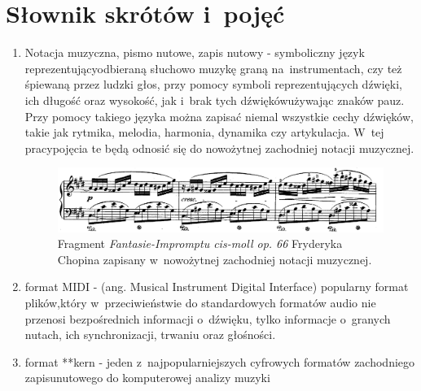 \section{Słownik skrótów i~pojęć}
	
\begin{enumerate}
	\item Notacja muzyczna, pismo nutowe, zapis nutowy - symboliczny język reprezentujący\linebreak odbieraną słuchowo muzykę graną na~instrumentach, czy też śpiewaną przez ludzki głos, przy pomocy symboli reprezentujących dźwięki, ich długość oraz wysokość, jak i~brak tych dźwięków\linebreak używając znaków pauz. Przy pomocy takiego języka można zapisać niemal wszystkie cechy dźwięków, takie jak rytmika, melodia, harmonia, dynamika czy artykulacja. W~tej pracy\linebreak pojęcia te będą odnosić się do nowożytnej zachodniej notacji muzycznej.
	
	\begin{figure}[htb]
		\centering
		\includegraphics[width=13cm]{images/chopin_fastasie_impromtu_no_4_op_66.png}
		\caption{Fragment \textit{Fantasie-Impromptu cis-moll op. 66} Fryderyka Chopina zapisany w~nowożytnej zachodniej notacji muzycznej. }
		\label{fig:chopin_impromptu}
	\end{figure}
	
	\item format MIDI - (ang. Musical Instrument Digital Interface) popularny format plików,\linebreak który w~przeciwieństwie do standardowych formatów audio nie przenosi bezpośrednich informacji o~dźwięku, tylko informacje o~granych nutach, ich synchronizacji, trwaniu oraz głośności.
	
	\item format **kern - jeden z~najpopularniejszych cyfrowych formatów zachodniego zapisu\linebreak nutowego do komputerowej analizy muzyki
\end{enumerate}
	